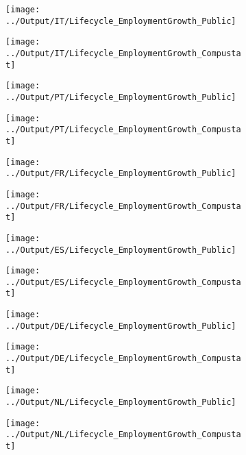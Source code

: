 \documentclass[12pt,notitlepage]{article}
\begin{document}
\begin{figure}[!htpb]
\centering
\begin{subfigure}{.49\textwidth}
    \centering
 \texttt{[image: ../Output/IT/Lifecycle\_EmploymentGrowth\_Public]}
\end{subfigure}%
\begin{subfigure}{.49\textwidth}
    \centering
 \texttt{[image: ../Output/IT/Lifecycle\_EmploymentGrowth\_Compustat]}
\end{subfigure}
\begin{subfigure}{.49\textwidth}
    \centering
 \texttt{[image: ../Output/PT/Lifecycle\_EmploymentGrowth\_Public]}
\end{subfigure}%
\begin{subfigure}{.49\textwidth}
    \centering
 \texttt{[image: ../Output/PT/Lifecycle\_EmploymentGrowth\_Compustat]}
\end{subfigure}
\begin{subfigure}{.49\textwidth}
    \centering
 \texttt{[image: ../Output/FR/Lifecycle\_EmploymentGrowth\_Public]}
\end{subfigure}%
\begin{subfigure}{.49\textwidth}
    \centering
 \texttt{[image: ../Output/FR/Lifecycle\_EmploymentGrowth\_Compustat]}
\end{subfigure}
\end{figure}
\pagebreak
\begin{figure}[!htpb]
\centering
\begin{subfigure}{.49\textwidth}
    \centering
 \texttt{[image: ../Output/ES/Lifecycle\_EmploymentGrowth\_Public]}
\end{subfigure}%
\begin{subfigure}{.49\textwidth}
    \centering
 \texttt{[image: ../Output/ES/Lifecycle\_EmploymentGrowth\_Compustat]}
\end{subfigure}
\begin{subfigure}{.49\textwidth}
    \centering
 \texttt{[image: ../Output/DE/Lifecycle\_EmploymentGrowth\_Public]}
\end{subfigure}%
\begin{subfigure}{.49\textwidth}
    \centering
 \texttt{[image: ../Output/DE/Lifecycle\_EmploymentGrowth\_Compustat]}
\end{subfigure}
\begin{subfigure}{.49\textwidth}
    \centering
 \texttt{[image: ../Output/NL/Lifecycle\_EmploymentGrowth\_Public]}
\end{subfigure}%
\begin{subfigure}{.49\textwidth}
    \centering
 \texttt{[image: ../Output/NL/Lifecycle\_EmploymentGrowth\_Compustat]}
\end{subfigure}
\end{figure}
\end{document}
